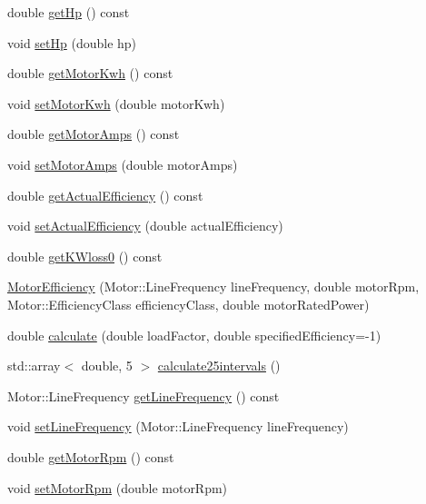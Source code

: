 \begin{DoxyCompactItemize}
\item 
double \hyperlink{class_motor_efficiency_a9f88159c82daa270975d7969debe88a9}{get\+Hp} () const
\item 
void \hyperlink{class_motor_efficiency_a4b86113447665413ddbae115199d9b3f}{set\+Hp} (double hp)
\item 
double \hyperlink{class_motor_efficiency_a4d21d0c44ee00f5d097b0acbcb73a8d8}{get\+Motor\+Kwh} () const
\item 
void \hyperlink{class_motor_efficiency_ab1c7507bac259565e43a6777d079148b}{set\+Motor\+Kwh} (double motor\+Kwh)
\item 
double \hyperlink{class_motor_efficiency_a955906509a4b49274b35c1b119c4a4b4}{get\+Motor\+Amps} () const
\item 
void \hyperlink{class_motor_efficiency_ac86aa8d6162e63eb440e07e557534c74}{set\+Motor\+Amps} (double motor\+Amps)
\item 
double \hyperlink{class_motor_efficiency_ae40031307b8631cf40df1c4069069dc0}{get\+Actual\+Efficiency} () const
\item 
void \hyperlink{class_motor_efficiency_a7a5ad8d01fdc0a3bf93d952752487496}{set\+Actual\+Efficiency} (double actual\+Efficiency)
\item 
double \hyperlink{class_motor_efficiency_a47398ac8203f5b79a0ca435673a4bc16}{get\+K\+Wloss0} () const
\item 
\hyperlink{class_motor_efficiency_a04625cbf2e8e6fea0fb1d005bd36808c}{Motor\+Efficiency} (Motor\+::\+Line\+Frequency line\+Frequency, double motor\+Rpm, Motor\+::\+Efficiency\+Class efficiency\+Class, double motor\+Rated\+Power)
\item 
double \hyperlink{class_motor_efficiency_ace29950c3155ea4befd7961e28376e23}{calculate} (double load\+Factor, double specified\+Efficiency=-\/1)
\item 
std\+::array$<$ double, 5 $>$ \hyperlink{class_motor_efficiency_ac2bd043e7da0bea7e78b31528d1951a9}{calculate25intervals} ()
\item 
Motor\+::\+Line\+Frequency \hyperlink{class_motor_efficiency_a3cc0ed606154a04d035399e05d1cb02a}{get\+Line\+Frequency} () const
\item 
void \hyperlink{class_motor_efficiency_a993b09941d330d3a46e0d72bd6dc65bb}{set\+Line\+Frequency} (Motor\+::\+Line\+Frequency line\+Frequency)
\item 
double \hyperlink{class_motor_efficiency_ab29655f487e90a73246be6e9bc67c36a}{get\+Motor\+Rpm} () const
\item 
void \hyperlink{class_motor_efficiency_a2c4ddf9f2f3e44c098dad91a0ddbaf21}{set\+Motor\+Rpm} (double motor\+Rpm)

\end{DoxyCompactItemize}
